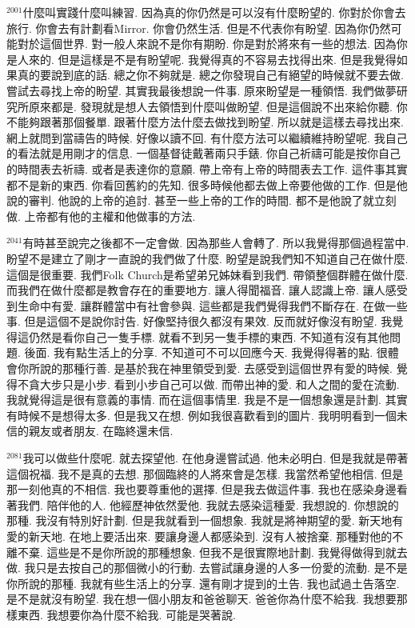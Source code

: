 \documentclass{book}
\begin{document}
$^{2001}$什麼叫實踐什麼叫練習.
因為真的你仍然是可以沒有什麼盼望的.
你對於你會去旅行.
你會去有計劃看Mirror.
你會仍然生活.
但是不代表你有盼望.
因為你仍然可能對於這個世界.
對一般人來說不是你有期盼.
你是對於將來有一些的想法.
因為你是人來的.
但是這樣是不是有盼望呢.
我覺得真的不容易去找得出來.
但是我覺得如果真的要說到底的話.
總之你不夠就是.
總之你發現自己有絕望的時候就不要去做.
嘗試去尋找上帝的盼望.
其實我最後想說一件事.
原來盼望是一種領悟.
我們做夢研究所原來都是.
發現就是想人去領悟到什麼叫做盼望.
但是這個說不出來給你聽.
你不能夠跟著那個餐單.
跟著什麼方法什麼去做找到盼望.
所以就是這樣去尋找出來.
網上就問到當禱告的時候.
好像以讀不回.
有什麼方法可以繼續維持盼望呢.
我自己的看法就是用剛才的信息.
一個基督徒戴著兩只手錶.
你自己祈禱可能是按你自己的時間表去祈禱.
或者是表達你的意願.
帶上帝有上帝的時間表去工作.
這件事其實都不是新的東西.
你看回舊約的先知.
很多時候他都去做上帝要他做的工作.
但是他說的審判.
他說的上帝的追討.
甚至一些上帝的工作的時間.
都不是他說了就立刻做.
上帝都有他的主權和他做事的方法.

$^{2041}$有時甚至說完之後都不一定會做.
因為那些人會轉了.
所以我覺得那個過程當中.
盼望不是建立了剛才一直說的我們做了什麼.
盼望是說我們知不知道自己在做什麼.
這個是很重要.
我們Folk Church是希望弟兄姊妹看到我們.
帶領整個群體在做什麼.
而我們在做什麼都是教會存在的重要地方.
讓人得聞福音.
讓人認識上帝.
讓人感受到生命中有愛.
讓群體當中有社會參與.
這些都是我們覺得我們不斷存在.
在做一些事.
但是這個不是說你討告.
好像堅持很久都沒有果效.
反而就好像沒有盼望.
我覺得這仍然是看你自己一隻手標.
就看不到另一隻手標的東西.
不知道有沒有其他問題.
後面.
我有點生活上的分享.
不知道可不可以回應今天.
我覺得得著的點.
很體會你所說的那種行善.
是基於我在神里領受到愛.
去感受到這個世界有愛的時候.
覺得不貪大步只是小步.
看到小步自己可以做.
而帶出神的愛.
和人之間的愛在流動.
我就覺得這是很有意義的事情.
而在這個事情里.
我是不是一個想象還是計劃.
其實有時候不是想得太多.
但是我又在想.
例如我很喜歡看到的圖片.
我明明看到一個未信的親友或者朋友.
在臨終還未信.

$^{2081}$我可以做些什麼呢.
就去探望他.
在他身邊嘗試過.
他未必明白.
但是我就是帶著這個祝福.
我不是真的去想.
那個臨終的人將來會是怎樣.
我當然希望他相信.
但是那一刻他真的不相信.
我也要尊重他的選擇.
但是我去做這件事.
我也在感染身邊看著我們.
陪伴他的人.
他經歷神依然愛他.
我就去感染這種愛.
我想說的.
你想說的那種.
我沒有特別好計劃.
但是我就看到一個想象.
我就是將神期望的愛.
新天地有愛的新天地.
在地上要活出來.
要讓身邊人都感染到.
沒有人被捨棄.
那種對他的不離不棄.
這些是不是你所說的那種想象.
但我不是很實際地計劃.
我覺得做得到就去做.
我只是去按自己的那個微小的行動.
去嘗試讓身邊的人多一份愛的流動.
是不是你所說的那種.
我就有些生活上的分享.
還有剛才提到的土告.
我也試過土告落空.
是不是就沒有盼望.
我在想一個小朋友和爸爸聊天.
爸爸你為什麼不給我.
我想要那樣東西.
我想要你為什麼不給我.
可能是哭著說.
\end{document}
